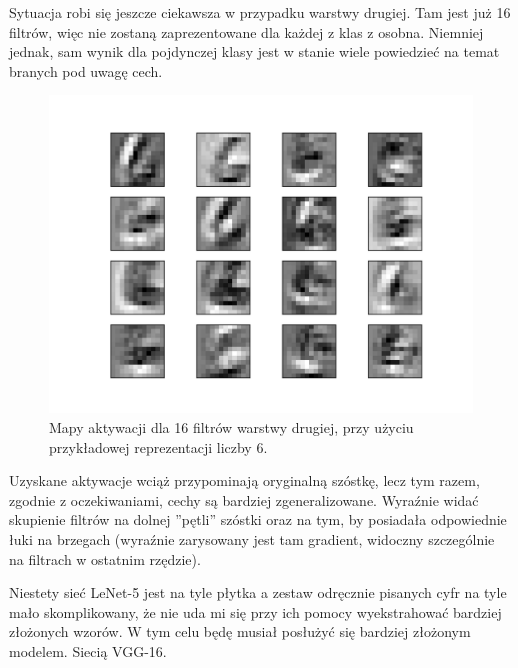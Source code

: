 Sytuacja robi się jeszcze ciekawsza w przypadku warstwy drugiej. Tam jest już 16 filtrów, więc nie zostaną zaprezentowane dla każdej z klas z osobna. Niemniej jednak, sam wynik dla pojdynczej klasy jest w stanie wiele powiedzieć na temat branych pod uwagę cech.

\begin{figure}[ht]
\centerline{\includegraphics[scale=0.75]{resources/second_layer_gd_lenet.png}}
\caption{Mapy aktywacji dla 16 filtrów warstwy drugiej, przy użyciu przykładowej reprezentacji liczby 6.}
\label{fig:lenet5-mapy-aktywacji-l2}
\end{figure}

Uzyskane aktywacje wciąż przypominają oryginalną szóstkę, lecz tym razem, zgodnie z oczekiwaniami, cechy są bardziej zgeneralizowane.
Wyraźnie widać skupienie filtrów na dolnej ''pętli'' szóstki oraz na tym, by posiadała odpowiednie łuki na brzegach (wyraźnie zarysowany jest tam gradient, widoczny szczególnie na filtrach w ostatnim rzędzie).

Niestety sieć LeNet-5 jest na tyle płytka a zestaw odręcznie pisanych cyfr na tyle mało skomplikowany, że nie uda mi się przy ich pomocy wyekstrahować bardziej złożonych wzorów. W tym celu będę musiał posłużyć się bardziej złożonym modelem. Siecią VGG-16. 
